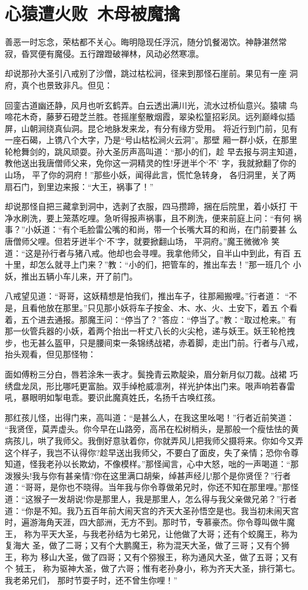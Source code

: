 \chapter{心猿遭火败~木母被魔擒}

善恶一时忘念，荣枯都不关心。晦明隐现任浮沉，随分饥餐渴饮。神静湛然常
寂，昏冥便有魔侵。五行蹭蹬破禅林，风动必然寒凛。

却说那孙大圣引八戒别了沙僧，跳过枯松涧，径来到那怪石崖前。果见有一座
洞府，真个也景致非凡。但见：

回銮古道幽还静，风月也听玄鹤弄。白云透出满川光，流水过桥仙意兴。猿啸
鸟啼花木奇，藤萝石磴芝兰胜。苍摇崖壑散烟霞，翠染松篁招彩凤。远列巅峰似插
屏，山朝涧绕真仙洞。昆仑地脉发来龙，有分有缘方受用。
将近行到门前，见有一座石碣，上镌八个大字，乃是“号山枯松涧火云洞”。那壁
厢一群小妖，在那里轮枪舞剑的，跳风顽耍。孙大圣厉声高叫道：“那小的们，趁
早去报与洞主知道，教他送出我唐僧师父来，免你这一洞精灵的性!牙迸半个‘不’
字，我就掀翻了你的山场，平了你的洞府！”那些小妖，闻得此言，慌忙急转身，
各归洞里，关了两扇石门，到里边来报：“大王，祸事了！”

却说那怪自把三藏拿到洞中，选剥了衣服，四马攒蹄，捆在后院里，着小妖打
干净水刷洗，要上笼蒸吃哩。急听得报声祸事，且不刷洗，便来前庭上问：“有何
祸事？”小妖道：“有个毛脸雷公嘴的和尚，带一个长嘴大耳的和尚，在门前要甚
么唐僧师父哩。但若牙迸半个‘不’字，就要掀翻山场，平洞府。”魔王微微冷
笑道：“这是孙行者与猪八戒。他却也会寻哩。我拿他师父，自半山中到此，有百
五十里，却怎么就寻上门来？”教：“小的们，把管车的，推出车去！”那一班几个
小妖，推出五辆小车儿来，开了前门。

八戒望见道：“哥哥，这妖精想是怕我们，推出车子，往那厢搬哩。”行者道：
“不是，且看他放在那里。”只见那小妖将车子按金、木、水、火、土安下，着五
个看着，五个进去通报。那魔王问：“停当了？”答应：“停当了。”教：“取过枪来。”
有那一伙管兵器的小妖，着两个抬出一杆丈八长的火尖枪，递与妖王。妖王轮枪拽
步，也无甚么盔甲，只是腰间束一条锦绣战裙，赤着脚，走出门前。行者与八戒，
抬头观看，但见那怪物：

面如傅粉三分白，唇若涂朱一表才。鬓挽青云欺靛染，眉分新月似刀裁。战裙
巧绣盘龙凤，形比哪吒更富胎。双手绰枪威凛冽，祥光护体出门来。哏声响若春雷
吼，暴眼明如掣电乖。要识此魔真姓氏，名扬千古唤红孩。

那红孩儿怪，出得门来，高叫道：“是甚么人，在我这里吆喝！”行者近前笑道：
“我贤侄，莫弄虚头。你今早在山路旁，高吊在松树梢头，是那般一个瘦怯怯的黄
病孩儿，哄了我师父。我倒好意驮着你，你就弄风儿把我师父摄将来。你如今又弄
这个样子，我岂不认得你?趁早送出我师父，不要白了面皮，失了亲情；恐你令尊
知道，怪我老孙以长欺幼，不像模样。”那怪闻言，心中大怒，咄的一声喝道：“那
泼猴头!我与你有甚亲情?你在这里满口胡柴，绰甚声经儿!那个是你贤侄？”行者
道：“哥哥，是你也不晓得。当年我与你令尊做弟兄时，你还不知在那里哩。”那怪
道：“这猴子一发胡说!你是那里人，我是那里人，怎么得与我父亲做兄弟？”行者
道：“你是不知。我乃五百年前大闹天宫的齐天大圣孙悟空是也。我当初未闹天宫
时，遍游海角天涯，四大部洲，无方不到。那时节，专慕豪杰。你令尊叫做牛魔王，
称为平天大圣，与我老孙结为七弟兄，让他做了大哥；还有个蛟魔王，称为复海大
圣，做了二哥；又有个大鹏魔王，称为混天大圣，做了三哥；又有个狮王，称为
移山大圣，做了四哥；又有个猕猴王，称为通风大圣，做了五哥；又有个狨王，
称为驱神大圣，做了六哥；惟有老孙身小，称为齐天大圣，排行第七。我老弟兄们，
那时节耍子时，还不曾生你哩！”

